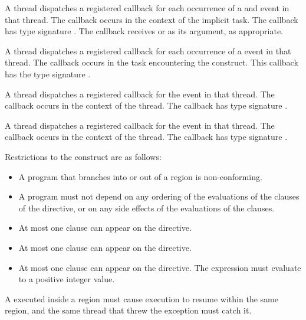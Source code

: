 A thread dispatches a registered 
callback for each occurrence of a  and
 event in that thread. The callback occurs in the
context of the implicit task.  The callback has type signature
. The callback receives
 or 
as its  argument, as appropriate.

A thread dispatches a registered 
callback for each occurrence of a  event in that
thread.  The callback occurs in the task encountering
the  construct.  This callback has the type signature
.

A thread dispatches a registered 
callback for the  event in that thread.
The callback occurs in the
context of the thread.  The callback has type signature
.

A thread dispatches a registered 
callback for the  event in that thread.
The callback occurs in the context of the thread.  The callback has type signature
.

\restrictions
Restrictions to the  construct are as follows:

\begin{itemize}
\item A program that branches into or out of a  region is non-conforming.

\item A program must not depend on any ordering of the evaluations of the clauses of the
 directive, or on any side effects of the evaluations of the clauses.

\item At most one  clause can appear on the directive.

\item At most one  clause can appear on the directive.

\item At most one  clause can appear on the directive. The 
expression must evaluate to a positive integer value.
\end{itemize}

\begin{ccppspecific}
A  executed inside a  region must cause execution to resume
within the same  region, and the same thread that threw the exception
must catch it.
\end{ccppspecific}

